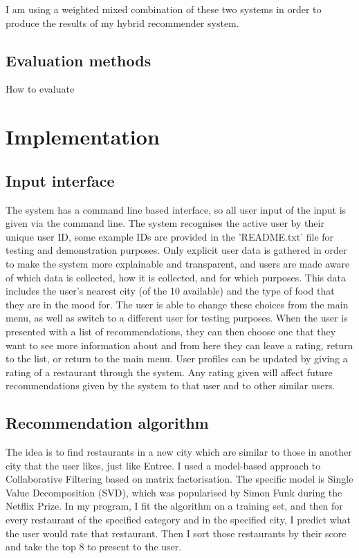 \documentclass[conference]{IEEEtran}
\begin{document}
I am using a weighted mixed combination of these two systems in order to produce the results
of my hybrid recommender system.

\subsection{Evaluation methods}
How to evaluate


\section{Implementation}

\subsection{Input interface}
The system has a command line based interface, so all user input of the input is given via the command line. 
The system recognises the active user by their unique user ID, some example IDs are provided in the 'README.txt' 
file for testing and demonstration purposes. 
Only explicit user data is gathered in order to make the system more explainable and transparent, 
and users are made aware of which data is collected, how it is collected, and for which purposes. 
This data includes the user's nearest city (of the 10 available) and the type of food that 
they are in the mood for. 
The user is able to change these choices from the main menu, as well as switch to a different user 
for testing purposes. 
When the user is presented with a list of recommendations, they can then choose one that they want 
to see more information about and from here they can leave a rating, return to the list, or return to 
the main menu. 
User profiles can be updated by giving a rating of a restaurant through the system. 
Any rating given will affect future recommendations given by the system to that user 
and to other similar users. 

\subsection{Recommendation algorithm}
The idea is to find restaurants in a new city which are similar to those in another city that the user likes, just like Entree. 
I used a model-based approach to Collaborative Filtering based on matrix factorisation. 
The specific model is Single Value Decomposition (SVD), which was popularised by Simon Funk during the Netflix Prize. 
In my program, I fit the algorithm on a training set, and then for every restaurant of the specified category 
and in the specified city, I predict what the user would rate that restaurant. 
Then I sort those restaurants by their score and take the top 8 to present to the user. 
\end{document}
